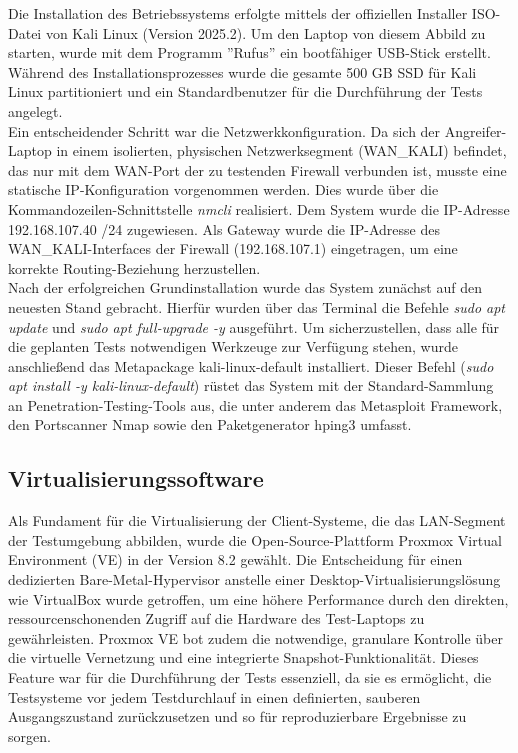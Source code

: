 Die Installation des Betriebssystems erfolgte mittels der offiziellen Installer ISO-Datei von Kali Linux (Version 2025.2). Um den Laptop von diesem Abbild zu starten, wurde mit dem Programm ''Rufus'' ein bootfähiger USB-Stick erstellt. Während des Installationsprozesses wurde die gesamte 500 GB SSD für Kali Linux partitioniert und ein Standardbenutzer für die Durchführung der Tests angelegt.\\

Ein entscheidender Schritt war die Netzwerkkonfiguration. Da sich der Angreifer-Laptop in einem isolierten, physischen Netzwerksegment (WAN\_KALI) befindet, das nur mit dem WAN-Port der zu testenden Firewall verbunden ist, musste eine statische IP-Konfiguration vorgenommen werden. Dies wurde über die Kommandozeilen-Schnittstelle \textit{nmcli} realisiert. Dem System wurde die IP-Adresse 192.168.107.40 /24 zugewiesen. Als Gateway wurde die IP-Adresse des WAN\_KALI-Interfaces der Firewall (192.168.107.1) eingetragen, um eine korrekte Routing-Beziehung herzustellen.\\

Nach der erfolgreichen Grundinstallation wurde das System zunächst auf den neuesten Stand gebracht. Hierfür wurden über das Terminal die Befehle \textit{sudo apt update} und \textit{sudo apt full-upgrade -y} ausgeführt. Um sicherzustellen, dass alle für die geplanten Tests notwendigen Werkzeuge zur Verfügung stehen, wurde anschließend das Metapackage kali-linux-default installiert. Dieser Befehl (\textit{sudo apt install -y kali-linux-default}) rüstet das System mit der Standard-Sammlung an Penetration-Testing-Tools aus, die unter anderem das Metasploit Framework, den Portscanner Nmap sowie den Paketgenerator hping3 umfasst.\\


\subsection{Virtualisierungssoftware}

Als Fundament für die Virtualisierung der Client-Systeme, die das LAN-Segment der Testumgebung abbilden, wurde die Open-Source-Plattform Proxmox Virtual Environment (VE) in der Version 8.2 gewählt. Die Entscheidung für einen dedizierten Bare-Metal-Hypervisor anstelle einer Desktop-Virtualisierungslösung wie VirtualBox wurde getroffen, um eine höhere Performance durch den direkten, ressourcenschonenden Zugriff auf die Hardware des Test-Laptops zu gewährleisten. Proxmox VE bot zudem die notwendige, granulare Kontrolle über die virtuelle Vernetzung und eine integrierte Snapshot-Funktionalität. Dieses Feature war für die Durchführung der Tests essenziell, da sie es ermöglicht, die Testsysteme vor jedem Testdurchlauf in einen definierten, sauberen Ausgangszustand zurückzusetzen und so für reproduzierbare Ergebnisse zu sorgen.\\

